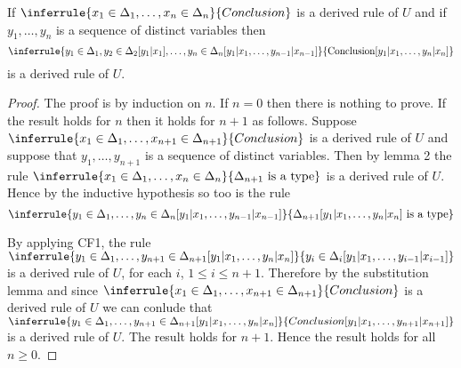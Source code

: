 \begin{corollary} 
If $\inferrule{x_1\in\Delta_1,\ldots,x_n\in\Delta_n}{Conclusion}$ is a derived rule of $U$ and if $y_1,\ldots,y_n$ is a sequence of distinct variables then
\[ \inferrule{y_1\in\Delta_1,y_2\in\Delta_2[y_1|x_1],\ldots,y_n\in\Delta_n[y_1|x_1,\ldots,y_{n-1}|x_{n-1}]}{\text{Conclusion}[y_1|x_1,\ldots,y_n|x_n]}
\]
is a derived rule of $U$.
\end{corollary}
\begin{proof}
  The proof is by induction on $n$.
  If $n=0$ then there is nothing to prove.
  If the result holds for $n$ then it holds for $n+1$ as follows.
  Suppose $\inferrule{x_1\in\Delta_1,\ldots,x_{n+1}\in\Delta_{n+1}}{Conclusion}$ is a derived rule of $U$ and suppose that $y_1,\ldots,y_{n+1}$ is a sequence of distinct variables.
  Then by lemma 2 the rule $\inferrule{x_1\in\Delta_1,\ldots,x_n\in\Delta_n}{\Delta_{n+1}\isatype}$ is a derived rule of $U$.
  Hence by the inductive hypothesis so too is the rule
  \[\inferrule{y_1\in\Delta_1,\ldots,y_n\in\Delta_n[y_1|x_1,\ldots,y_{n-1}|x_{n-1}]}{\Delta_{n+1}[y_1|x_1,\ldots,y_n|x_n]\isatype}
  \]

  By applying CF1, the rule $\inferrule{y_1\in\Delta_1,\ldots,y_{n+1}\in\Delta_{n+1}[y_1|x_1,\ldots,y_n|x_n]}{y_i\in\Delta_i[y_1|x_1,\ldots,y_{i-1}|x_{i-1}]}$ is a derived rule of $U$, for each $i$, $1\leq i\leq n+1$.
  Therefore by the substitution lemma and since $\inferrule{x_1\in\Delta_1,\ldots,x_{n+1}\in\Delta_{n+1}}{Conclusion}$ is a derived rule of $U$ we can conlude that $\inferrule{y_1\in\Delta_1,\ldots,y_{n+1}\in\Delta_{n+1}[y_1|x_1,\ldots,y_n|x_n]}{Conclusion[y_1|x_1,\ldots,y_{n+1}|x_{n+1}]}$ is a derived rule of $U$.
  The result holds for $n+1$.
  Hence the result holds for all $n\geq 0$.
\end{proof}

